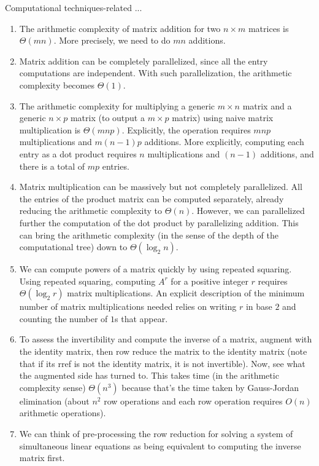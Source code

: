 \documentclass[10pt]{amsart}
\begin{document}
Computational techniques-related ...

\begin{enumerate}
\item The arithmetic complexity of matrix addition for two $n \times
  m$ matrices is $\Theta (mn)$. More precisely, we need to do $mn$
  additions.
\item Matrix addition can be completely parallelized, since all the
  entry computations are independent. With such parallelization, the
  arithmetic complexity becomes $\Theta(1)$.
\item The arithmetic complexity for multiplying a generic $m \times n$
  matrix and a generic $n \times p$ matrix (to output a $m \times p$
  matrix) using naive matrix multiplication is
  $\Theta(mnp)$. Explicitly, the operation requires $mnp$
  multiplications and $m(n-1)p$ additions. More explicitly, computing
  each entry as a dot product requires $n$ multiplications and $(n -
  1)$ additions, and there is a total of $mp$ entries.
\item Matrix multiplication can be massively but not completely
  parallelized. All the entries of the product matrix can be computed
  separately, already reducing the arithmetic complexity to
  $\Theta(n)$. However, we can parallelized further the computation of
  the dot product by parallelizing addition. This can bring the
  arithmetic complexity (in the sense of the depth of the
  computational tree) down to $\Theta(\log_2n)$.
\item We can compute powers of a matrix quickly by using repeated
  squaring. Using repeated squaring, computing $A^r$ for a positive
  integer $r$ requires $\Theta(\log_2r)$ matrix multiplications. An
  explicit description of the minimum number of matrix multiplications
  needed relies on writing $r$ in base $2$ and counting the number of
  $1$s that appear.
\item To assess the invertibility and compute the inverse of a matrix,
  augment with the identity matrix, then row reduce the matrix to the
  identity matrix (note that if its rref is not the identity matrix,
  it is not invertible). Now, see what the augmented side has turned
  to. This takes time (in the arithmetic complexity sense)
  $\Theta(n^3)$ because that's the time taken by Gauss-Jordan
  elimination (about $n^2$ row operations and each row operation
  requires $O(n)$ arithmetic operations).
\item We can think of pre-processing the row reduction for solving a
  system of simultaneous linear equations as being equivalent to
  computing the inverse matrix first.
\end{enumerate}
\end{document}
